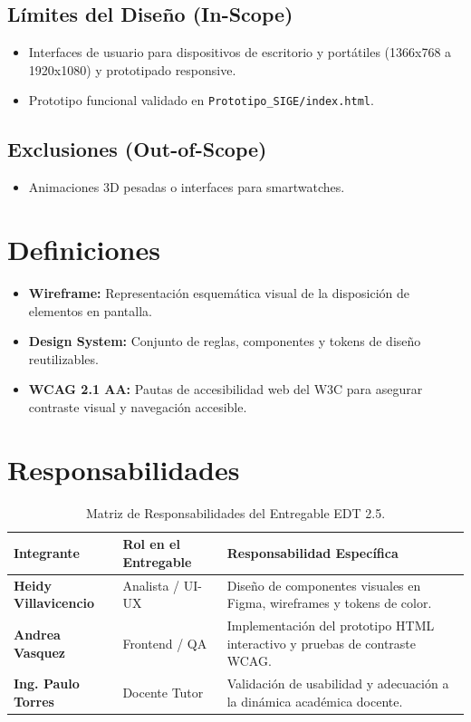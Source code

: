 \documentclass[12pt,a4paper]{article}
\begin{document}
\subsection{Límites del Diseño (In-Scope)}
\begin{itemize}[leftmargin=1.5em, itemsep=2pt]
    \item Interfaces de usuario para dispositivos de escritorio y portátiles (1366x768 a 1920x1080) y prototipado responsive.
    \item Prototipo funcional validado en \texttt{Prototipo\_SIGE/index.html}.
\end{itemize}

\subsection{Exclusiones (Out-of-Scope)}
\begin{itemize}[leftmargin=1.5em, itemsep=2pt]
    \item Animaciones 3D pesadas o interfaces para smartwatches.
\end{itemize}

\section{Definiciones}
\begin{itemize}[leftmargin=1.5em, itemsep=2pt]
    \item \textbf{Wireframe:} Representación esquemática visual de la disposición de elementos en pantalla.
    \item \textbf{Design System:} Conjunto de reglas, componentes y tokens de diseño reutilizables.
    \item \textbf{WCAG 2.1 AA:} Pautas de accesibilidad web del W3C para asegurar contraste visual y navegación accesible.
\end{itemize}

\section{Responsabilidades}
\begin{table}[htbp]
\centering
\small
\begin{tabularx}{\textwidth}{|>{\hsize=0.65\hsize\bfseries}X|>{\hsize=0.85\hsize}X|>{\hsize=1.5\hsize}X|}
    \hline
    \rowcolor{tableheader}
    Integrante & Rol en el Entregable & Responsabilidad Específica \\
    \hline
    Heidy Villavicencio & Analista / UI-UX & Diseño de componentes visuales en Figma, wireframes y tokens de color. \\
    \hline
    Andrea Vasquez & Frontend / QA & Implementación del prototipo HTML interactivo y pruebas de contraste WCAG. \\
    \hline
    Ing. Paulo Torres & Docente Tutor & Validación de usabilidad y adecuación a la dinámica académica docente. \\
    \hline
\end{tabularx}
\caption{Matriz de Responsabilidades del Entregable EDT 2.5.}
\end{table}
\end{document}
